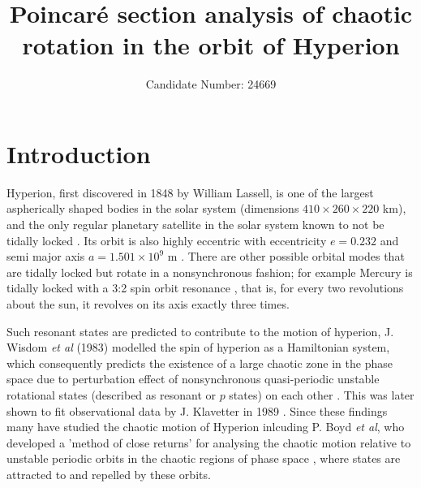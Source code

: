 \documentclass[10pt, twocolumn]{article} %
\title{\textbf{Poincar\'e section analysis of chaotic rotation in the orbit of Hyperion}}
\author{Candidate Number: 24669}
\affil{Department of Physics, University of Bath, Bath BA2 7AY, United Kingdom}
\begin{document}
\medskip

\section*{Introduction}
Hyperion, first discovered in 1848 by William Lassell\cite{NASA_Hyperion}, is one of the largest aspherically shaped bodies in the solar system (dimensions $410\times260\times220$ km)\cite{NASA_Hyperion}, and the only regular planetary satellite in the solar system known to not be tidally locked \cite{NASA_Hyperion}. Its orbit is also highly eccentric with eccentricity $e = 0.232$ and semi major axis $a = 1.501\times10^9$ m \cite{NASA_Hyperion}. There are other possible orbital modes that are tidally locked but rotate in a nonsynchronous fashion; for example Mercury is tidally locked with a 3:2 spin orbit resonance \cite{Giuseppe_1966}, that is, for every two revolutions about the sun, it revolves on its axis exactly three times.

Such resonant states are predicted to contribute to the motion of hyperion, J. Wisdom \textit{et al} (1983) modelled the spin of hyperion as a Hamiltonian system, which consequently predicts the existence of a large chaotic zone in the phase space due to perturbation effect of nonsynchronous quasi-periodic unstable rotational states (described as resonant or $p$ states) on each other \cite{Wisdom_1984}. This was later shown to fit observational data by J. Klavetter in 1989 \cite{Klavetter_1989} \cite{Binzel_1986}. Since these findings many have studied the chaotic motion of Hyperion inlcuding P. Boyd \textit{et al}, who developed a 'method of close returns' for analysing the chaotic motion relative to unstable periodic orbits in the chaotic regions of phase space \cite{Boyd_1994}, where states are attracted to and repelled by these orbits.
\end{document}
